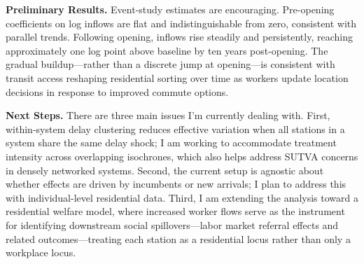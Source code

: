 \documentclass[11pt]{article}
\newcommand{\h}[1]{\textbf{\color{uchired}#1}\;}
\begin{document}
\h{Preliminary Results.} Event-study estimates are encouraging. Pre-opening coefficients on log inflows are flat and indistinguishable from zero, consistent with parallel trends. Following opening, inflows rise steadily and persistently, reaching approximately one log point above baseline by ten years post-opening. The gradual buildup---rather than a discrete jump at opening---is consistent with transit access reshaping residential sorting over time as workers update location decisions in response to improved commute options.

\h{Next Steps.} There are three main issues I'm currently dealing with. First, within-system delay clustering reduces effective variation when all stations in a system share the same delay shock; I am working to accommodate treatment intensity across overlapping isochrones, which also helps address SUTVA concerns in densely networked systems. Second, the current setup is agnostic about whether effects are driven by incumbents or new arrivals; I plan to address this with individual-level residential data. Third, I am extending the analysis toward a residential welfare model, where increased worker flows serve as the instrument for identifying downstream social spillovers---labor market referral effects and related outcomes---treating each station as a residential locus rather than only a workplace locus.
\end{document}
